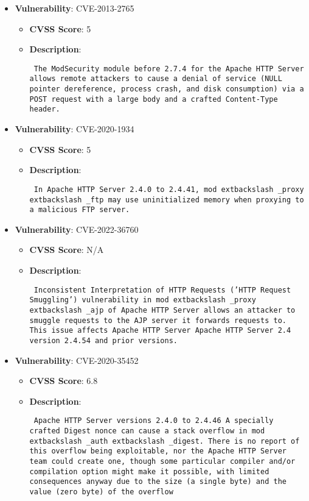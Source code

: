 \documentclass{article}
\begin{document}
\begin{itemize}
    
        \item \textbf{Vulnerability}: CVE-2013-2765
        \begin{itemize}
            \item \textbf{CVSS Score}:  5 
            \item \textbf{Description}: \parbox{\linewidth}{\texttt{ The ModSecurity module before 2.7.4 for the Apache HTTP Server allows remote attackers to cause a denial of service (NULL pointer dereference, process crash, and disk consumption) via a POST request with a large body and a crafted Content-Type header. }}
        \end{itemize}
    
        \item \textbf{Vulnerability}: CVE-2020-1934
        \begin{itemize}
            \item \textbf{CVSS Score}:  5 
            \item \textbf{Description}: \parbox{\linewidth}{\texttt{ In Apache HTTP Server 2.4.0 to 2.4.41, mod	extbackslash _proxy	extbackslash _ftp may use uninitialized memory when proxying to a malicious FTP server. }}
        \end{itemize}
    
        \item \textbf{Vulnerability}: CVE-2022-36760
        \begin{itemize}
            \item \textbf{CVSS Score}:  N/A 
            \item \textbf{Description}: \parbox{\linewidth}{\texttt{ Inconsistent Interpretation of HTTP Requests ('HTTP Request Smuggling') vulnerability in mod	extbackslash _proxy	extbackslash _ajp of Apache HTTP Server allows an attacker to smuggle requests to the AJP server it forwards requests to.  This issue affects Apache HTTP Server Apache HTTP Server 2.4 version 2.4.54 and prior versions. }}
        \end{itemize}
    
        \item \textbf{Vulnerability}: CVE-2020-35452
        \begin{itemize}
            \item \textbf{CVSS Score}:  6.8 
            \item \textbf{Description}: \parbox{\linewidth}{\texttt{ Apache HTTP Server versions 2.4.0 to 2.4.46 A specially crafted Digest nonce can cause a stack overflow in mod	extbackslash _auth	extbackslash _digest. There is no report of this overflow being exploitable, nor the Apache HTTP Server team could create one, though some particular compiler and/or compilation option might make it possible, with limited consequences anyway due to the size (a single byte) and the value (zero byte) of the overflow }}
        \end{itemize}
    

\end{itemize}
\end{document}
